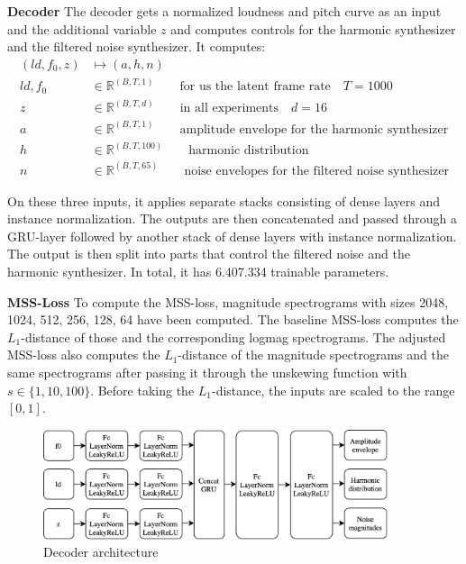 \begin{theappendices}
\textbf{Decoder}
The decoder gets a normalized loudness and pitch curve as an input and the additional variable $z$ and computes controls for the harmonic synthesizer and the filtered noise synthesizer.
It computes:
\begin{equation}
    \begin{split}
    (ld, f_0, z) & \mapsto (a, h, n) \\
    ld, f_0 &\in \mathbb{R}^{(B, T, 1)} \qquad \text{for us the latent frame rate} \quad T = 1000 \\
    z &\in \mathbb{R}^{(B, T, d)} \qquad \text{in all experiments} \quad d=16 \\
    a &\in \mathbb{R}^{(B, T, 1)}  \qquad \text{amplitude envelope for the harmonic synthesizer} \\
    h &\in \mathbb{R}^{(B, T, 100)}  \qquad \text{harmonic distribution} \\
    n &\in \mathbb{R}^{(B, T, 65)} \qquad \text{noise envelopes for the filtered noise synthesizer}
    \end{split}
\end{equation}

On these three inputs, it applies separate stacks consisting of dense layers and instance normalization. The outputs are then concatenated and passed through a GRU-layer followed by another stack of dense layers with instance normalization. The output is then split into parts that control the filtered noise and the harmonic synthesizer.
In total, it has 6.407.334 trainable parameters.



\textbf{MSS-Loss}
To compute the MSS-loss, magnitude spectrograms with sizes 2048, 1024, 512, 256, 128, 64 have been computed. The baseline MSS-loss computes the $L_1$-distance of those and the corresponding logmag spectrograms.
The adjusted MSS-loss also computes the $L_1$-distance of the magnitude spectrograms and the same spectrograms after passing it through the unskewing function  with $s \in \{1, 10, 100\}$.
Before taking the $L_1$-distance, the inputs are scaled to the range $[0, 1]$.

\begin{figure}
    \includegraphics[width=0.9\textwidth]{figures/decoder.png}
    \caption{Decoder architecture}
    \label{fig:decoder}
\end{figure}


\end{theappendices}
